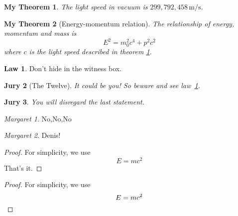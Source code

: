 \documentclass[12pt]{ctexrep}
\begin{document}
\newtheorem{mythm}{My Theorem}[section]
\begin{mythm}\label{thm:light}
The light speed in vacuum
is $299,792,458\,\mathrm{m/s}$.
\end{mythm}
\begin{mythm}[Energy-momentum relation]
The relationship of energy,
momentum and mass is 
\[
E^2 = m_0^2 c^4 + p^2 c^2\]
where $c$ is the light speed
described in theorem \ref{thm:light}.
\end{mythm}

\theoremstyle{definition} \newtheorem{law}{Law}
\theoremstyle{plain} \newtheorem{jury}[law]{Jury}
\theoremstyle{remark} \newtheorem*{mar}{Margaret}

\begin{law}\label{law:box}
Don't hide in the witness box.
\end{law}
\begin{jury}[The Twelve]
It could be you! So beware and
see law~\ref{law:box}.\end{jury}
\begin{jury}
You will disregard the last 
statement. \end{jury}
\begin{mar}No,No,No\end{mar}
\begin{mar}Denis!\end{mar}



\begin{proof}
For simplicity, we use 
\[
E=mc^2  
\]
That's it.
\end{proof}

\begin{proof}
For simplicity, we use 
\[
E=mc^2 \qedhere  
\]
\end{proof}
\end{document}
